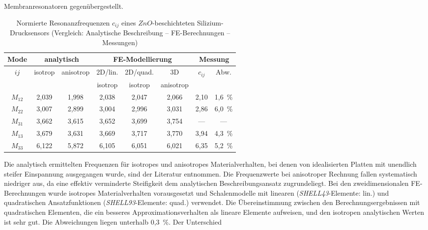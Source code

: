 Membranresonatoren gegenübergestellt.
\begin{table}[htb]
\caption
 {\label{tabmembranfreqvgl}
 Normierte Resonanzfrequenzen $c_{ij}$ eines $ZnO$-beschichteten
 Silizium-Drucksensors
 (Vergleich: Analytische Beschreibung -- FE-Berechnungen -- Messungen)}
\begin{center}
\begin{tabular}{|c||c|c||c|c|c||c|c|}
\hline
 Mode & \multicolumn{2}{c||}{analytisch} & \multicolumn{3}{c||}{FE-Modellierung}
 & \multicolumn{2}{c|}{Messung} \\
\hline
 $ij$ & isotrop & anisotrop & 2D/lin. & 2D/quad. & 3D & $c_{ij}$ & Abw. \\[-1.2ex]
 & \cite{Pon91} & \cite{Pon91} & isotrop & isotrop & anisotrop &  & \\
\hline \hline
 $M_{12}$ & 2,039 & 1,998 & 2,038 & 2,047 & 2,066 & 2,10 & 1,6~\% \\
\hline
 $M_{22}$ & 3,007 & 2,899 & 3,004 & 2,996 & 3,031 & 2,86 & 6,0~\%\\
\hline
 $M_{31}$ & 3,662 & 3,615 & 3,652 & 3,699 & 3,754 & --- & --- \\
\hline
 $M_{13}$ & 3,679 & 3,631 & 3,669 & 3,717 &3,770 & 3,94 & 4,3~\%\\
\hline
 $M_{33}$ & 6,122 & 5,872 & 6,105 & 6,051 & 6,021 & 6,35 & 5,2~\%\\
\hline
\end{tabular}
\end{center}
\end{table}
Die analytisch ermittelten Frequenzen für isotropes und anisotropes
Materialverhalten, bei denen von idealisierten Platten mit unendlich steifer
Einspannung ausgegangen wurde, sind der Literatur \cite{Pon91} entnommen.
Die Frequenzwerte bei anisotroper Rechnung fallen systematisch niedriger aus,
da eine effektiv verminderte Steifigkeit dem analytischen
Beschreibungsansatz zugrundeliegt.
Bei den zweidimensionalen FE-Berechnungen wurde isotropes
Materialverhalten vorausgesetzt und Schalenmodelle mit linearen
({\em SHELL43}-Elemente: lin.) und quadratischen Ansatzfunktionen
({\em SHELL93}-Elemente: quad.) verwendet.
Die Übereinstimmung zwischen den Berechnungsergebnissen mit quadratischen
Elementen, die ein besseres Approximationsverhalten als lineare Elemente
aufweisen, und den isotropen analytischen Werten ist
sehr gut. Die Abweichungen liegen unterhalb 0,3~\%. Der Unterschied
